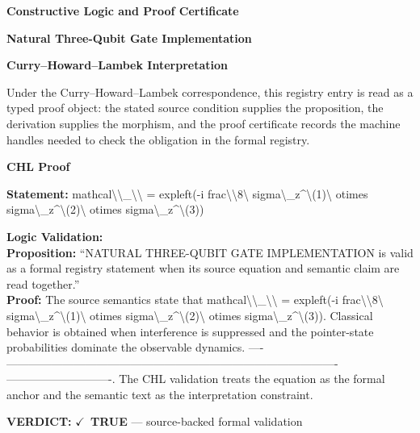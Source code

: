\clearpage
\begingroup\tzpsupportsetup
\noindent\textbf{\fontsize{10.8pt}{12.8pt}\selectfont [ID 0481] Constructive Logic and Proof Certificate}\par
\noindent\textbf{\fontsize{10pt}{12pt}\selectfont Natural Three-Qubit Gate Implementation}\par
\vspace{0.45em}
\begingroup
\footnotesize
\setlength{\parskip}{0.22em}
\setlength{\parindent}{0pt}
\noindent\textbf{Curry--Howard--Lambek Interpretation}\par
Under the Curry--Howard--Lambek correspondence, this registry entry is read as a typed proof
object: the stated source condition supplies the proposition, the derivation supplies the
morphism, and the proof certificate records the machine handles needed to check the obligation
in the formal registry.

\vspace{0.45em}
\noindent\textbf{CHL Proof}\par
\textbf{Statement:} mathcal\textbackslash{}\textbackslash{}\_\textbackslash{}\textbackslash{} = expleft(-i frac\textbackslash{}\textbackslash{}8\textbackslash{} sigma\textbackslash{}\_z\textasciicircum{}\textbackslash{}(1)\textbackslash{} otimes sigma\textbackslash{}\_z\textasciicircum{}\textbackslash{}(2)\textbackslash{} otimes
sigma\textbackslash{}\_z\textasciicircum{}\textbackslash{}(3))

\textbf{Logic Validation:}\\
\textbf{Proposition:} ``NATURAL THREE-QUBIT GATE IMPLEMENTATION is valid as a formal registry statement when its
source equation and semantic claim are read together.''\\
\textbf{Proof:} The source semantics state that mathcal\textbackslash{}\textbackslash{}\_\textbackslash{}\textbackslash{} = expleft(-i frac\textbackslash{}\textbackslash{}8\textbackslash{} sigma\textbackslash{}\_z\textasciicircum{}\textbackslash{}(1)\textbackslash{} otimes
sigma\textbackslash{}\_z\textasciicircum{}\textbackslash{}(2)\textbackslash{} otimes sigma\textbackslash{}\_z\textasciicircum{}\textbackslash{}(3)). Classical behavior is obtained when interference
is suppressed and the pointer-state probabilities dominate the observable dynamics. ----
----------------------------------------------------------------------------------------
----------------------------. The CHL validation treats the equation as the formal
anchor and the semantic text as the interpretation constraint.

\textbf{VERDICT:} \ensuremath{\checkmark}\ \textbf{TRUE} --- source-backed formal validation


